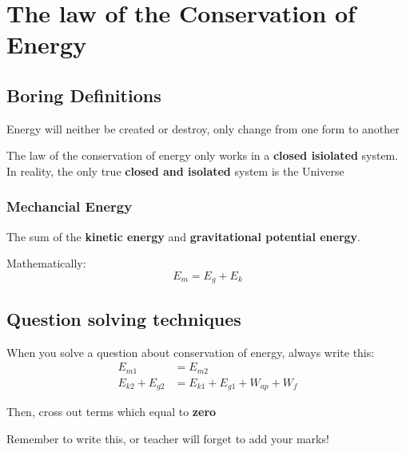 \section{The law of the Conservation of Energy}
\subsection{Boring Definitions}
\begin{definition}
     Energy will neither be created or destroy, only change from one form to another
\end{definition}

\begin{remark}
    The law of the conservation of energy only works in a \textbf{closed isiolated} system. In reality, the only true \textbf{closed and isolated} system is the Universe
\end{remark}

\subsubsection*{Mechancial Energy}
\begin{definition}
      The sum of the \textbf{kinetic energy} and \textbf{gravitational potential energy}.
\end{definition}

Mathematically:
\begin{equation}
    E_m = E_g + E_k
\end{equation}

\subsection{Question solving techniques}
When you solve a question about conservation of energy, always write this:
\begin{align*}
    E_{m1} &= E_{m2}\\
    E_{k2} + E_{g2} &= E_{k1} + E_{g1} + W_{ap} + W_{f}
\end{align*}

Then, cross out terms which equal to \textbf{zero}

\begin{remark}
    Remember to write this, or teacher will forget to add your marks!
\end{remark}
